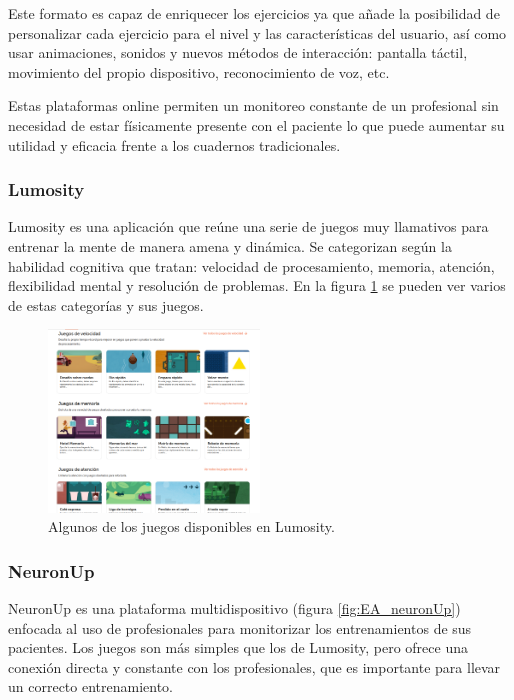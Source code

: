 Este formato es capaz de enriquecer los ejercicios ya que añade la posibilidad de personalizar cada ejercicio para el nivel y las características del usuario, así como usar animaciones, sonidos y nuevos métodos de interacción: pantalla táctil, movimiento del propio dispositivo, reconocimiento de voz, etc.

Estas plataformas online permiten un monitoreo constante de un profesional sin necesidad de estar físicamente presente con el paciente lo que puede aumentar su utilidad y eficacia frente a los cuadernos tradicionales.

\subsubsection{Lumosity}

Lumosity es una aplicación que reúne una serie de juegos muy llamativos para entrenar la mente de manera amena y dinámica. Se categorizan según la habilidad cognitiva que tratan: velocidad de procesamiento, memoria, atención, flexibilidad mental y resolución de problemas. En la figura \ref{fig:EA_lumosity} se pueden ver varios de estas categorías y sus juegos. \cite{EA_ent_lumosity}

\begin{figure}
  \centering
\includegraphics[width=0.5\textwidth]{03.EstudioProblema/01.EstadoArte/00.Figuras/05.lumosity.png}
    \caption{Algunos de los juegos disponibles en Lumosity.}
    \label{fig:EA_lumosity}
\end{figure}


\subsubsection{NeuronUp}

NeuronUp es una plataforma multidispositivo (figura \ref{fig:EA_neuronUp}) enfocada al uso de profesionales para monitorizar los entrenamientos de sus pacientes. Los juegos son más simples que los de Lumosity, pero ofrece una conexión directa y constante con los profesionales, que es importante para llevar un correcto entrenamiento. \cite{EA_ent_neuronup}

